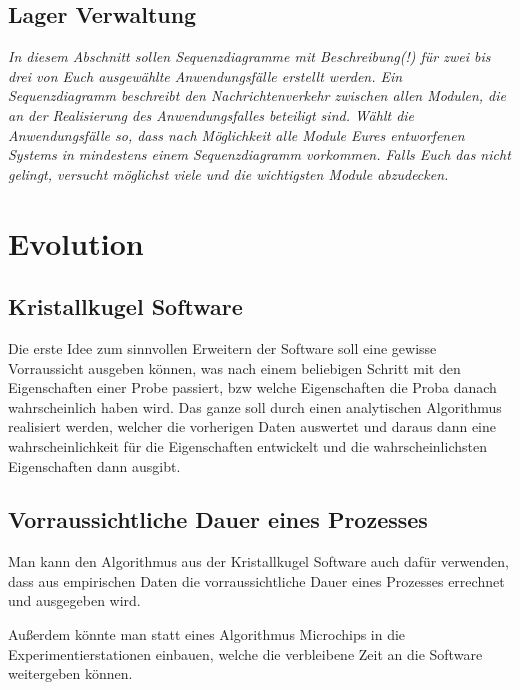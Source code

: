 \documentclass[enabledeprecatedfontcommands,fontsize=12pt,paper=a4,twoside]{scrartcl}
\begin{document}
\subsection{Lager Verwaltung}



{\it In diesem Abschnitt sollen Sequenzdiagramme mit Beschreibung(!)
  für zwei bis drei von Euch ausgewählte
    Anwendungsfälle
  erstellt werden. Ein Sequenzdiagramm beschreibt den
  Nachrichtenverkehr zwischen allen Modulen, die an der Realisierung
  des Anwendungsfalles beteiligt sind.  Wählt die
    Anwendungsfälle so, dass nach Möglichkeit alle Module Eures
    entworfenen Systems in mindestens einem Sequenzdiagramm
    vorkommen. Falls Euch das nicht gelingt, versucht möglichst viele
    und die wichtigsten Module abzudecken. }

\section{Evolution}

\label{sec:evolution}

\subsection{Kristallkugel Software}
{
Die erste Idee zum sinnvollen Erweitern der Software soll eine gewisse Vorraussicht ausgeben können, was nach einem beliebigen Schritt mit den Eigenschaften einer Probe passiert, bzw welche Eigenschaften die Proba danach wahrscheinlich haben wird. Das ganze soll durch einen analytischen Algorithmus realisiert werden, welcher die vorherigen Daten auswertet und daraus dann eine wahrscheinlichkeit für die Eigenschaften entwickelt und die wahrscheinlichsten Eigenschaften dann ausgibt. 
}
\subsection{Vorraussichtliche Dauer eines Prozesses}
{
Man kann den Algorithmus aus der Kristallkugel Software auch dafür verwenden, dass aus empirischen Daten die vorraussichtliche Dauer eines Prozesses errechnet und ausgegeben wird. 

Außerdem könnte man statt eines Algorithmus Microchips in die Experimentierstationen einbauen, welche die verbleibene Zeit an die Software weitergeben können. 
}
\end{document}
